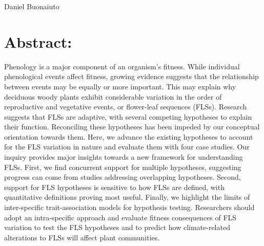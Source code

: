 \documentclass[10.5pt,a4paper]{article}
\begin{document}
Daniel Buonaiuto
\newpage
\section*{Abstract:} %
Phenology is a major component of an organism's fitness. While individual phenological events affect fitness, growing evidence suggests that the relationship between events may be equally or more important. This may explain why deciduous woody plants exhibit considerable variation in the order of reproductive and vegetative events, or flower-leaf sequences (FLSs). Research suggests that FLSs are adaptive, with several competing hypotheses to explain their function. Reconciling these hypotheses has been impeded by our conceptual orientation towards them. Here, we advance the existing hypotheses to account for the FLS variation in nature and evaluate them with four case studies. Our inquiry provides major insights towards a new framework for understanding FLSs. First, we find concurrent support for multiple hypotheses, suggesting progress can come from studies addressing overlapping hypotheses. Second, support for FLS hypotheses is sensitive to how FLSs are defined, with quantitative definitions proving most useful. Finally, we highlight the limits of inter-specific trait-association models for hypothesis testing. Researchers should adopt an intra-specific approach and evaluate fitness consequences of FLS variation to test the FLS hypotheses and to predict how climate-related alterations to FLSs will affect plant communities. %
\end{document}
